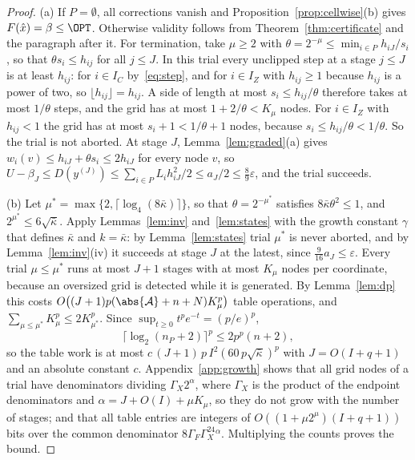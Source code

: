 \begin{proof}
(a) If $P=\emptyset$, all corrections vanish and
Proposition~\ref{prop:cellwise}(b) gives $F(\hat x)=\beta\le\OPT$. Otherwise
validity follows from Theorem~\ref{thm:certificate} and the paragraph after
it.
For termination, take $\mu\ge2$ with
$\theta=2^{-\mu}\le\min_{i\in P}h_{iJ}/s_i$, so that $\theta s_i\le h_{ij}$
for all $j\le J$. In this trial every unclipped step at a stage $j\le J$ is
at least $h_{ij}$: for $i\in I_C$ by~\eqref{eq:step}, and for $i\in I_Z$ with
$h_{ij}\ge1$ because $h_{ij}$ is a power of two, so
$\lfloor h_{ij}\rfloor=h_{ij}$. A side of length at most $s_i\le h_{ij}/\theta$
therefore takes at most $1/\theta$ steps, and the grid has at most
$1+2/\theta<K_\mu$ nodes. For $i\in I_Z$ with $h_{ij}<1$ the grid has at most
$s_i+1<1/\theta+1$ nodes, because $s_i\le h_{ij}/\theta<1/\theta$. So the
trial is not aborted. At stage $J$, Lemma~\ref{lem:graded}(a) gives
$w_i(v)\le h_{iJ}+\theta s_i\le2h_{iJ}$ for every node $v$, so
$U-\beta_J\le D(y^{(J)})\le\sum_{i\in P}L_ih_{iJ}^2/2\le a_J/2
\le\frac89\varepsilon$, and the trial succeeds.

(b) Let $\mu^*=\max\{2,\lceil\log_4(8\bar\kappa)\rceil\}$, so that
$\theta=2^{-\mu^*}$ satisfies $8\bar\kappa\theta^2\le1$, and
$2^{\mu^*}\le6\sqrt{\bar\kappa}$. Apply Lemmas~\ref{lem:inv}
and~\ref{lem:states} with the growth constant $\gamma$ that defines
$\bar\kappa$ and $k=\bar\kappa$: by Lemma~\ref{lem:states} trial $\mu^*$ is
never aborted, and by Lemma~\ref{lem:inv}(iv) it succeeds at stage $J$ at the
latest, since $\frac9{16}a_J\le\varepsilon$. Every trial $\mu\le\mu^*$ runs
at most $J+1$ stages with at most $K_\mu$ nodes per coordinate, because an
oversized grid is detected while it is generated. By Lemma~\ref{lem:dp} this
costs $O\bigl((J+1)p(\abs{\mathcal A}+n+N)K_\mu^p\bigr)$ table operations,
and $\sum_{\mu\le\mu^*}K_\mu^p\le2K_{\mu^*}^p$. Since
$\sup_{t\ge0}t^pe^{-t}=(p/e)^p$,
\begin{equation}\label{eq:logabsorb}
\lceil\log_2(n_P+2)\rceil^p\le2p^p(n+2),
\end{equation}
so the table work is at most $c\,(J+1)\,p\,I^2(60\,p\sqrt{\bar\kappa})^p$
with $J=O(I+q+1)$ and an absolute constant $c$.
Appendix~\ref{app:growth} shows that all grid nodes of a trial have
denominators dividing $\Gamma_X2^\alpha$, where $\Gamma_X$ is the product of
the endpoint denominators and $\alpha=J+O(I)+\mu K_\mu$, so they do not grow
with the number of stages; and that all table entries are integers of
$O((1+\mu2^\mu)(I+q+1))$ bits over the common denominator
$8\Gamma_F\Gamma_X^24^\alpha$. Multiplying the counts proves the bound.
\end{proof}

